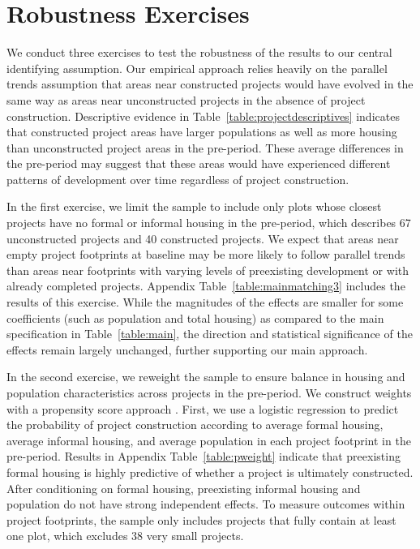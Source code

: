 \documentclass[12pt]{article}
\begin{document}
\section{Robustness Exercises}\label{section:robustness}

We conduct three exercises to test the robustness of the results to our central identifying assumption.  Our empirical approach relies heavily on the parallel trends assumption that areas near constructed projects would have evolved in the same way as areas near unconstructed projects in the absence of project construction.  Descriptive evidence in Table~\ref{table:projectdescriptives} indicates that constructed project areas have larger populations as well as more housing than unconstructed project areas in the pre-period.  These average differences in the pre-period may suggest that these areas would have experienced different patterns of development over time regardless of project construction.  

In the first exercise, we limit the sample to include only plots whose closest projects have no formal or informal housing in the pre-period, which describes 67 unconstructed projects and 40 constructed projects.  We expect that areas near empty project footprints at baseline may be more likely to follow parallel trends than areas near footprints with varying levels of preexisting development or with already completed projects.  Appendix Table~\ref{table:mainmatching3} includes the results of this exercise.  While the magnitudes of the effects are smaller for some coefficients (such as population and total housing) as compared to the main specification in Table~\ref{table:main}, the direction and statistical significance of the effects remain largely unchanged, further supporting our main approach.


In the second exercise, we reweight the sample to ensure balance in housing and population characteristics across projects in the pre-period.  We construct weights with a propensity score approach \citep{angrist2008mostly}.  First, we use a logistic regression to predict the probability of project construction according to average formal housing, average informal housing, and average population in each project footprint in the pre-period.  Results in Appendix Table~\ref{table:pweight} indicate that preexisting formal housing is highly predictive of whether a project is ultimately constructed.  After conditioning on formal housing, preexisting informal housing and population do not have strong independent effects.  To measure outcomes within project footprints, the sample only includes projects that fully contain at least one plot, which excludes 38 very small projects. 
\end{document}
